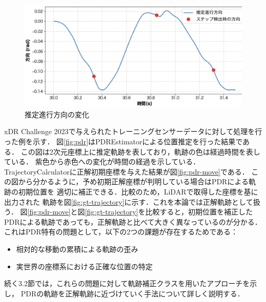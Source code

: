 \begin{figure}[H]
	\centering
	\includegraphics[width=\linewidth]{image/step_timing_angle.jpg}
	\caption{推定進行方向の変化}    \label{fig:step_timing}
\end{figure}


xDR Challenge 2023で与えられたトレーニングセンサーデータに対して処理を行った例を示す．
図\ref{fig:pdr}はPDREstimatorによる位置推定を行った結果である．
この図は2次元座標上に推定軌跡を表しており，軌跡の色は経過時間を表している．
紫色から赤色への変化が時間の経過を示している．
TrajectoryCalculatorに正解初期座標を与えた結果が図\ref{fig:pdr-move}である．
この図から分かるように，予め初期正解座標が判明している場合はPDRによる軌跡の初期位置を
適切に補正できる．比較のため，LiDARで取得した座標を基に出力された
軌跡を図\ref{fig:gt-trajectory}に示す．これを本論では正解軌跡として扱う．
図\ref{fig:pdr-move}と図\ref*{fig:gt-trajectory}を比較すると，初期位置を補正した
PDRによる軌跡であっても，正解軌跡と比べて大きく異なっているのが分かる．
これはPDR特有の問題として，以下の2つの課題が存在するためである：

\begin{itemize}
    \item 相対的な移動の累積による軌跡の歪み
    \item 実世界の座標系における正確な位置の特定
\end{itemize}


続く3.2節では，これらの問題に対して軌跡補正クラスを用いたアプローチを示し，
PDRの軌跡を正解軌跡に近づけていく手法について詳しく説明する．


